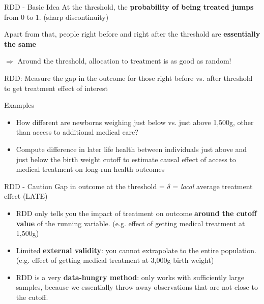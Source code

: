 \documentclass[11pt, aspectratio = 169]{beamer}
\begin{document}
	\begin{frame}{RDD - Basic Idea}
		At the threshold, the \textbf{probability of being treated jumps} from 0 to 1. (sharp discontinuity)
		\\ \medskip
        
		Apart from that, people right before and right after the threshold are \textbf{essentially the same} 
	
		$\Rightarrow$ Around the threshold, allocation to treatment is as good as random! \\
		\pause
		
		\medskip 
		\alert{RDD: Measure the gap in the outcome for those right before vs. after threshold to get treatment effect of interest} \\
	
			\begin{block}{Examples}
			\begin{itemize}
				\item 	 How different are newborns weighing just below vs. just above 1,500g, other than access to additional medical care? 
				\item 	Compute difference in later life health between individuals just above and just below the birth weight cutoff to estimate causal effect of access to medical treatment on long-run health outcomes
			\end{itemize}
		\end{block}
		\medskip 

	\end{frame}
	\begin{frame}{RDD - Caution}
				Gap in outcome at the threshold  = $\delta$ = \textit{local} average treatment effect (LATE)
				\medskip 
		\begin{itemize}
			\item RDD only tells you the impact of treatment on outcome \textbf{around the cutoff value} of the running variable. \color{gray}(e.g. effect of getting medical treatment at 1,500g) \color{black}
			\item	Limited \textbf{external validity}: you cannot extrapolate to the entire population. \color{gray}(e.g. effect of getting medical treatment at 3,000g birth weight) \color{black}
			\item	RDD is a very \textbf{data-hungry method}: only works with sufficiently large samples, because we essentially throw away observations that are not close to the cutoff.	
		\end{itemize}
	\end{frame}
\end{document}

